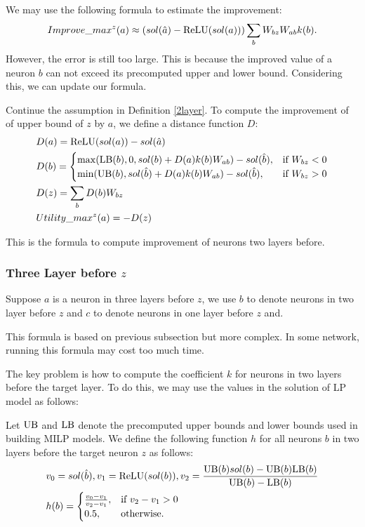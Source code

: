 We may use the following formula to estimate the improvement:  \begin{align*}
	Improve\_max^z(a) \approx (sol(\hat{a})-\mathrm{ReLU}(sol(a)))\sum_b W_{bz}W_{ab}k(b).
\end{align*}However, the error is still too large. This is because the improved value of a neuron $b$ can not exceed its precomputed upper and lower bound. Considering this, we can update our formula.

\begin{definition}
	Continue the assumption in Definition \ref{2layer}. To compute the improvement of of upper bound of $z$ by $a$, we define a distance function $D$:
	\begin{align}
		&D(a) = \mathrm{ReLU}(sol(a))-sol(\hat{a})\\
			&D(b) =
		\begin{cases}
			\max(\mathrm{LB}(b), 0, sol(b)+D(a)k(b)W_{ab})-sol(\hat{b}), & \text{if }W_{bz} < 0\\
			\min(\mathrm{UB}(b), sol(\hat{b})+D(a)k(b)W_{ab})-sol(\hat{b}), & \text{if }  W_{bz} > 0
		\end{cases}\\
		&D(z) = \sum_b D(b)W_{bz}\\
		&Utility\_max^z(a) = -D(z)
	\end{align}
\end{definition}
 This is the formula to compute improvement of neurons two layers before.


\subsubsection*{Three Layer before  $z$} 

Suppose $a$ is a neuron in three layers before $z$, we use $b$ to denote neurons in two layer before $z$ and $c$ to denote neurons in one layer before $z$ and. 

This formula is based on previous subsection but more complex. In some network, running this formula may cost too much time. 

The key problem is how to compute the coefficient $k$ for neurons in two layers before the target layer. To do this, we may use the values in the solution of LP model as follows:

\begin{definition}\label{3layer}
Let $\mathrm{UB}$ and $\mathrm{LB}$ denote the precomputed upper bounds and lower bounds used in building MILP models. We define the following function $h$ for all neurons $b$ in two layers before the target neuron $z$ as follows:
	\begin{align}
		&v_0 = sol(\hat{b}), v_1 = \mathrm{ReLU}(sol(b)), v_2 = \frac{\mathrm{UB}(b)sol(b)-\mathrm{UB}(b)\mathrm{LB}(b)}{\mathrm{UB}(b)-\mathrm{LB}(b)}\\
		&h(b) =
		\begin{cases}
			\frac{v_0-v_1}{v_2-v_1}, & \text{if } v_2-v_1 > 0\\
			0.5, & \text{otherwise.}
		\end{cases}
	\end{align} 
\end{definition} 

